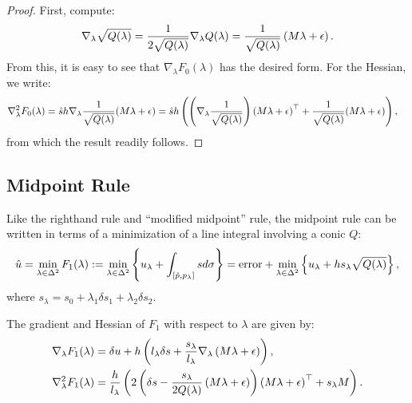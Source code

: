\documentclass[eikonal.tex]{subfiles}
\begin{document}
\begin{proof}
  First, compute:
  \begin{align*}
    \nabla_\lambda \sqrt{Q(\lambda)} = \frac{1}{2 \sqrt{Q(\lambda)}} \nabla_\lambda Q(\lambda) = \frac{1}{\sqrt{Q(\lambda)}}\left(M\lambda + \epsilon\right).
  \end{align*}
  From this, it is easy to see that $\nabla_\lambda F_0(\lambda)$ has
  the desired form. For the Hessian, we write:
  \begin{align*}
    \nabla_\lambda^2 F_0(\lambda)
    &= \hat{s}h \nabla_\lambda \frac{1}{\sqrt{Q(\lambda)}}{(M\lambda + \epsilon)} = \hat{s}h \left(\left(\nabla_\lambda \frac{1}{\sqrt{Q(\lambda)}}\right) {(M\lambda + \epsilon)}^\top + \frac{1}{\sqrt{Q(\lambda)}} {(M\lambda + \epsilon)}\right),
  \end{align*}
  from which the result readily follows.
\end{proof}

\subsection{Midpoint Rule}

Like the righthand rule and ``modified midpoint'' rule, the midpoint
rule can be written in terms of a minimization of a line integral
involving a conic $Q$:
\begin{align*}
  \hat{u} = \min_{\lambda \in \Delta^2} F_1(\lambda) := \min_{\lambda \in \Delta^2} \left\{u_\lambda + \int_{[\hat{p}, p_\lambda]} sd\sigma\right\} = \mbox{error} + \min_{\lambda \in \Delta^2} \left\{u_\lambda + h s_\lambda \sqrt{Q(\lambda)}\right\},
\end{align*}
where $s_\lambda = s_0 + \lambda_1 \delta s_1 + \lambda_2 \delta s_2$.

\begin{lemma}
  The gradient and Hessian of $F_1$ with respect to $\lambda$ are given by:
  \begin{align*}
    \nabla_\lambda F_1(\lambda) &= \delta u + h \left(l_\lambda \delta s + \frac{s_\lambda}{l_\lambda} \nabla_\lambda \left(M\lambda + \epsilon\right)\right), \\
    \nabla^2_\lambda F_1(\lambda) &= \frac{h}{l_\lambda} \left(2\left(\delta s - \frac{s_\lambda}{2Q(\lambda)}\left(M\lambda + \epsilon\right)\right)\left(M\lambda + \epsilon\right)^\top + s_\lambda M\right).
  \end{align*}
\end{lemma}
\end{document}
